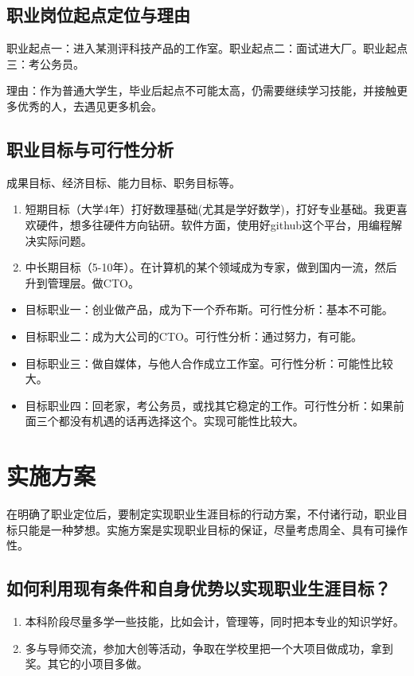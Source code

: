 \documentclass{article}
\begin{document}
\subsection{职业岗位起点定位与理由}
职业起点一：进入某测评科技产品的工作室。职业起点二：面试进大厂。职业起点三：考公务员。\par
理由：作为普通大学生，毕业后起点不可能太高，仍需要继续学习技能，并接触更多优秀的人，去遇见更多机会。
\subsection{职业目标与可行性分析}

成果目标、经济目标、能力目标、职务目标等。
\begin{enumerate}[(1)]
	\item 短期目标（大学4年）打好数理基础(尤其是学好数学)，打好专业基础。我更喜欢硬件，想多往硬件方向钻研。软件方面，使用好github这个平台，用编程解决实际问题。
	\item 中长期目标（5-10年）。在计算机的某个领域成为专家，做到国内一流，然后升到管理层。做CTO。
\end{enumerate}
\begin{itemize}
    \item 目标职业一：创业做产品，成为下一个乔布斯。可行性分析：基本不可能。
    \item 目标职业二：成为大公司的CTO。可行性分析：通过努力，有可能。
    \item 目标职业三：做自媒体，与他人合作成立工作室。可行性分析：可能性比较大。
    \item 目标职业四：回老家，考公务员，或找其它稳定的工作。可行性分析：如果前面三个都没有机遇的话再选择这个。实现可能性比较大。
\end{itemize}


\section{实施方案}
在明确了职业定位后，要制定实现职业生涯目标的行动方案，不付诸行动，职业目标只能是一种梦想。实施方案是实现职业目标的保证，尽量考虑周全、具有可操作性。\par


 \subsection{如何利用现有条件和自身优势以实现职业生涯目标？}
 \begin{enumerate}
 \item 本科阶段尽量多学一些技能，比如会计，管理等，同时把本专业的知识学好。
 \item 多与导师交流，参加大创等活动，争取在学校里把一个大项目做成功，拿到奖。其它的小项目多做。

 \end{enumerate}
\end{document}
